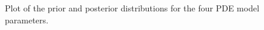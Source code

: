 \documentclass[]{bmcart}
\begin{document}
\begin{figure}[t]
\caption[Plot of the prior and posterior distributions for the four PDE model parameters.]{Plot of the prior and posterior distributions for the four PDE model parameters.}\label{fig:prior_posterior}
\end{figure}
\end{document}

